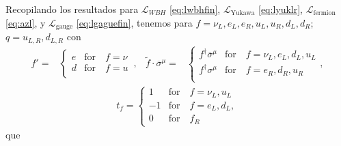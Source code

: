 Recopilando los resultados para $\mathcal{L}_{WBH}$
\eqref{eq:lwbhfin}, $\mathcal{L}_{\text{Yukawa}}$ \eqref{eq:lyuklr},
$\mathcal{L}_{\text{fermion}}$ \eqref{eq:azl}, y
$\mathcal{L}_{\text{gauge}}$ \eqref{eq:lgaguefin}, tenemos para
$f=\nu_L,e_L,e_R,u_L,u_R,d_L,d_R$; $q=u_{L,R},d_{L,R}$ con
\begin{align}
f'=&
\begin{cases}
  e &\text{for}\quad f=\nu\\
  d &\text{for}\quad f=u\\
\end{cases}\,,&
\widetilde{f}\cdot\overline{\sigma}^{\mu}=&
  \begin{cases}
    f^{\dagger}\overline{\sigma}^{\mu} & \text{for}\quad f=\nu_L,e_L,d_L,u_L\\
    f^{\dagger}{\sigma}^{\mu} & \text{for}\quad f=e_R,d_R,u_R\\
  \end{cases},
\end{align}
\begin{align}
  t_f=
  \begin{cases}
   1 & \text{for}\quad   f=\nu_L,u_L\\
   -1 & \text{for}\quad f=e_L,d_L,\\
   0 & \text{for}\quad f_R
  \end{cases}
\end{align}
que

